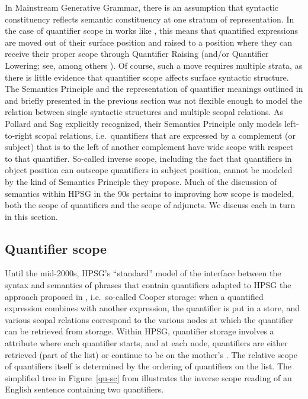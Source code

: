 \documentclass[output=paper]{langsci/langscibook}
\begin{document}
In Mainstream Generative Grammar, there is an assumption that syntactic constituency reflects semantic constituency at one stratum of representation. In the case of quantifier scope in works like \citet{May1985}, this means that quantified expressions are moved out of their surface position and raised to a position where they can receive their proper scope through Quantifier Raising (and/or Quantifier Lowering; see, among others \citealt{Hornstein1995}). Of course, such a move requires multiple strata, as there is little evidence that quantifier scope affects surface syntactic structure. The Semantics Principle and the representation of quantifier meanings outlined in \citet{PollardandSag1987} and briefly presented in the previous section was not flexible enough to model the relation between single syntactic structures and multiple scopal relations. As Pollard and Sag explicitly recognized, their Semantics Principle only models left-to-right scopal relations, i.e.\ quantifiers that are expressed by a complement (or subject) that is to the left of another complement have wide scope with respect to that quantifier. So-called inverse scope, including the fact that quantifiers in object position can outscope quantifiers in subject position, cannot be modeled by the kind of Semantics Principle they propose. Much of the discussion of semantics within HPSG in the 90s pertains to improving how scope is modeled, both the scope of quantifiers and the scope of adjuncts. We discuss each in turn in this section.


\subsection{Quantifier scope}

Until the mid-2000s, HPSG's ``standard'' model of the interface between the syntax and semantics of phrases that contain quantifiers adapted to HPSG the approach proposed in \citet{Cooper1975,Cooper1983}, i.e.\ so-called Cooper storage: when a quantified expression combines with another expression, the quantifier is put in a store, and various scopal relations correspond to the various nodes at which the quantifier can be retrieved from storage. Within HPSG, quantifier storage involves a  attribute where each quantifier starts, and at each node, quantifiers are either retrieved (part of the  list) or continue to be on the mother's . The relative scope of quantifiers itself is determined by the ordering of quantifiers on the  list. The simplified tree in Figure~\ref{qu-sc} from \citet[324]{PollardandSag1994} illustrates the inverse scope reading of an English sentence containing two quantifiers.
\end{document}

